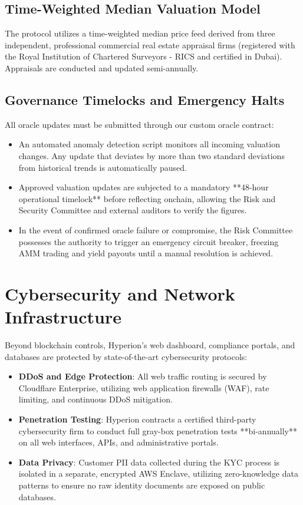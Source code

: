 \documentclass[11pt]{article}
\begin{document}
\subsection{Time-Weighted Median Valuation Model}
The protocol utilizes a time-weighted median price feed derived from three independent, professional commercial real estate appraisal firms (registered with the Royal Institution of Chartered Surveyors - RICS and certified in Dubai). Appraisals are conducted and updated semi-annually.

\subsection{Governance Timelocks and Emergency Halts}
All oracle updates must be submitted through our custom oracle contract:
\begin{itemize}
    \item An automated anomaly detection script monitors all incoming valuation changes. Any update that deviates by more than two standard deviations from historical trends is automatically paused.
    \item Approved valuation updates are subjected to a mandatory **48-hour operational timelock** before reflecting onchain, allowing the Risk and Security Committee and external auditors to verify the figures.
    \item In the event of confirmed oracle failure or compromise, the Risk Committee possesses the authority to trigger an emergency circuit breaker, freezing AMM trading and yield payouts until a manual resolution is achieved.
\end{itemize}

\section{Cybersecurity and Network Infrastructure}
Beyond blockchain controls, Hyperion’s web dashboard, compliance portals, and databases are protected by state-of-the-art cybersecurity protocols:
\begin{itemize}
    \item \textbf{DDoS and Edge Protection}: All web traffic routing is secured by Cloudflare Enterprise, utilizing web application firewalls (WAF), rate limiting, and continuous DDoS mitigation.
    \item \textbf{Penetration Testing}: Hyperion contracts a certified third-party cybersecurity firm to conduct full gray-box penetration tests **bi-annually** on all web interfaces, APIs, and administrative portals.
    \item \textbf{Data Privacy}: Customer PII data collected during the KYC process is isolated in a separate, encrypted AWS Enclave, utilizing zero-knowledge data patterns to ensure no raw identity documents are exposed on public databases.
\end{itemize}
\end{document}
